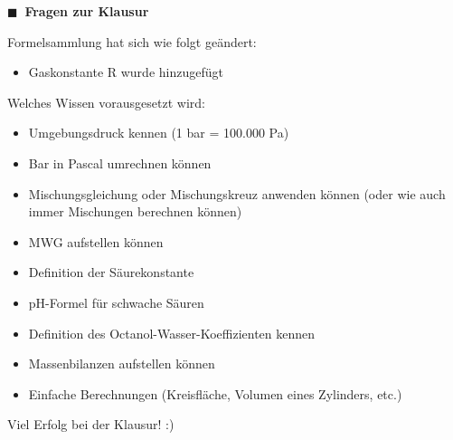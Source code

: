 \documentclass[aspectratio=169,9pt]{beamer}
\newcommand{\ey}{\color{miugray}$\blacktriangleright$}
\newcommand{\antwort}[1]{
\begin{tcolorbox}[
	enhanced,
	colframe=unigrau!65,
	sharp corners,
	boxsep=1pt,
	colback=white,
	coltitle=black,
]
	#1
	\end{tcolorbox}
}
\begin{document}
%
%






\begin{frame}
\hspace*{\fill}
\begin{minipage}{.7\textwidth}


{\color{miugray}$\blacksquare ~$} \textbf{Fragen zur Klausur} \par \vspace*{2mm}
\antwort{
Formelsammlung hat sich wie folgt geändert:
\begin{itemize}
\item[\ey] Gaskonstante R wurde hinzugefügt
\end{itemize}
Welches Wissen vorausgesetzt wird:
\begin{itemize}
\item[\ey] Umgebungsdruck kennen (1 bar = 100.000 Pa)
\item[\ey] Bar in Pascal umrechnen können
\item[\ey] Mischungsgleichung oder Mischungskreuz anwenden können (oder wie auch immer Mischungen berechnen können)
\item[\ey] MWG aufstellen können
\item[\ey] Definition der Säurekonstante 
\item[\ey] pH-Formel für schwache Säuren
\item[\ey] Definition des Octanol-Wasser-Koeffizienten kennen
\item[\ey] Massenbilanzen aufstellen können
\item[\ey] Einfache Berechnungen (Kreisfläche, Volumen eines Zylinders, etc.)
\end{itemize}
}

\end{minipage}%
%
\hspace*{\fill}
\end{frame}




\begin{frame}
\begin{center}
\LARGE Viel Erfolg bei der Klausur! :)
\end{center}
\end{frame}
\end{document}
